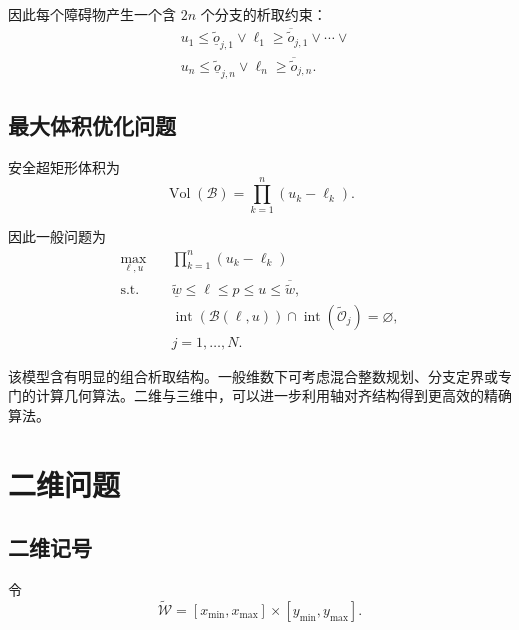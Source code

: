 \documentclass[UTF8,12pt,a4paper]{ctexart}
\newcommand{\vol}{\operatorname{Vol}}
\newcommand{\interior}{\operatorname{int}}
\begin{document}
因此每个障碍物产生一个含 $2n$ 个分支的析取约束：
\begin{equation}
\begin{aligned}
    &u_1\le \underline{\widetilde o}_{j,1}
    \lor
    \ell_1\ge \overline{\widetilde o}_{j,1}
    \lor\cdots\lor\\
    &u_n\le \underline{\widetilde o}_{j,n}
    \lor
    \ell_n\ge \overline{\widetilde o}_{j,n}.
\end{aligned}
\end{equation}

\subsection{最大体积优化问题}

安全超矩形体积为
\begin{equation}
    \vol(\mathcal B)
    =
    \prod_{k=1}^{n}(u_k-\ell_k).
\end{equation}

因此一般问题为
\begin{equation}
\boxed{
\begin{aligned}
    \max_{\ell,u}\quad
    &
    \prod_{k=1}^{n}(u_k-\ell_k)
    \\
    \text{s.t.}\quad
    &
    \underline{\widetilde w}
    \le\ell\le p\le u
    \le\overline{\widetilde w},
    \\
    &
    \interior(\mathcal B(\ell,u))
    \cap
    \interior(\widetilde{\mathcal O}_j)
    =
    \varnothing,
    \\
    &
    j=1,\ldots,N.
\end{aligned}}
\end{equation}

该模型含有明显的组合析取结构。一般维数下可考虑混合整数规划、分支定界或专门的计算几何算法。二维与三维中，可以进一步利用轴对齐结构得到更高效的精确算法。

\section{二维问题}

\subsection{二维记号}

令
\begin{equation}
    \widetilde{\mathcal W}
    =
    [x_{\min},x_{\max}]
    \times
    [y_{\min},y_{\max}].
\end{equation}
\end{document}
